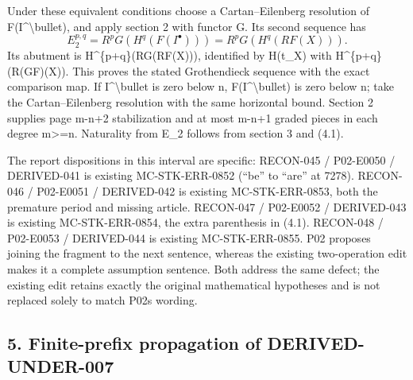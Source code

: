 Under these equivalent conditions choose a Cartan–\allowbreak{}Eilenberg resolution of F(I\textasciicircum{}\textbackslash{}bullet)\allowbreak{},\allowbreak{} and apply section 2 with functor G. Its second sequence has \[
 E_2^{p,q}=R^pG(H^q(F(I^\bullet)))=R^pG(H^q(RF(X))).
                                                               \tag{4.2}
\] Its abutment is H\textasciicircum{}\{p\allowbreak{}+q\}(RG(RF(X)\allowbreak{})\allowbreak{})\allowbreak{},\allowbreak{} identified by H(t\_\allowbreak{}X)\allowbreak{} with H\textasciicircum{}\{p\allowbreak{}+q\}(R(GF)\allowbreak{}(X)\allowbreak{})\allowbreak{}. This proves the stated Grothendieck sequence with the exact comparison map. If I\^{}\textbackslash bullet is zero below n,\allowbreak{} F(I\textasciicircum{}\textbackslash{}bullet)\allowbreak{} is zero below n; take the Cartan–\allowbreak{}Eilenberg resolution with the same horizontal bound. Section 2 supplies page m-n\allowbreak{}+2 stabilization and at most m-n\allowbreak{}+1 graded pieces in each degree m>\allowbreak{}=n. Naturality from E\_\allowbreak{}2 follows from section 3 and (4.1)\allowbreak{}.

The report dispositions in this interval are specific:\allowbreak{} RECON-045 /\allowbreak{} P02-E0050 /\allowbreak{} DERIVED-041 is existing MC-STK-ERR-0852 (``be'' to ``are'' at 7278)\allowbreak{}. RECON-046 /\allowbreak{} P02-E0051 /\allowbreak{} DERIVED-042 is existing MC-STK-ERR-0853,\allowbreak{} both the premature period and missing article. RECON-047 /\allowbreak{} P02-E0052 /\allowbreak{} DERIVED-043 is existing MC-STK-ERR-0854,\allowbreak{} the extra parenthesis in (4.1)\allowbreak{}. RECON-048 /\allowbreak{} P02-E0053 /\allowbreak{} DERIVED-044 is existing MC-STK-ERR-0855. P02 proposes joining the fragment to the next sentence,\allowbreak{} whereas the existing two-operation edit makes it a complete assumption sentence. Both address the same defect; the existing edit retains exactly the original mathematical hypotheses and is not replaced solely to match P02\textquotesingle s wording.

\subsection{5. Finite-prefix propagation of DERIVED-UNDER-007}\label{proofs-7096-7578-finite-prefix-propagation-of-derived-under-007}

